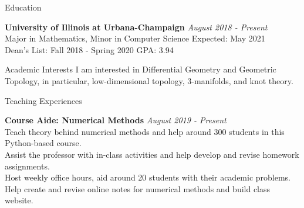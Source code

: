 \documentclass{cv} %
\begin{document}

\begin{rSection}{Education}

{\bf University of Illinois at Urbana-Champaign} \hfill {\em August 2018 - Present} 
\\ Major in Mathematics, Minor in Computer Science \hfill {Expected: May 2021}
\\ Dean's List: Fall 2018 - Spring 2020 \hfill {GPA: 3.94} 
\end{rSection}


\begin{rSection}{Academic Interests}
    I am interested in Differential Geometry and Geometric Topology, in particular, low-dimensional topology, 3-manifolds, and knot theory.
\end{rSection}




\begin{rSection}{Teaching Experiences}

{\bf Course Aide: Numerical Methods} \hfill {\em August 2019 - Present}
\\ \textbullet{} Teach theory behind numerical methods and help around 300 students in this Python-based course.
\\ \textbullet{} Assist the professor with in-class activities and help develop and revise homework assignments.
\\ \textbullet{} Host weekly office hours, aid around 20 students with their academic problems.
\\ \textbullet{} Help create and revise online notes for numerical methods and build class website.

\end{rSection}
\end{document}
